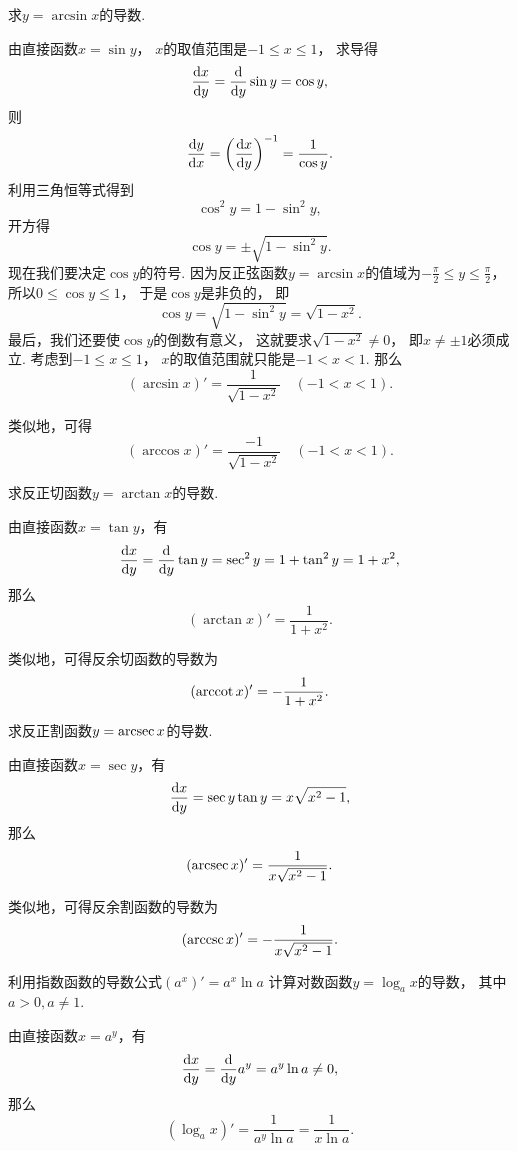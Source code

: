 \begin{example}
求\(y=\arcsin x\)的导数.
\begin{solution}
由直接函数\(x=\sin y\)，
\(x\)的取值范围是\(-1 \leq x \leq 1\)，
求导得\[
	\dv{x}{y}
	= \dv{y} \sin y
	= \cos y,
\]
则\[
	\dv{y}{x}
	= \left(\dv{x}{y}\right)^{-1}
	= \frac1{\cos y}.
\]
利用三角恒等式得到\[
	\cos^2 y = 1 - \sin^2 y,
\]
开方得\[
	\cos y = \pm\sqrt{1 - \sin^2 y}.
\]
现在我们要决定\(\cos y\)的符号.
因为反正弦函数\(y = \arcsin x\)的值域为\(-\frac\pi2 \leq y \leq \frac\pi2\)，
所以\(0 \leq \cos y \leq 1\)，
于是\(\cos y\)是非负的，
即\[
	\cos y
	= \sqrt{1 - \sin^2 y}
	= \sqrt{1 - x^2}.
\]
最后，我们还要使\(\cos y\)的倒数有意义，
这就要求\(\sqrt{1-x^2}\neq0\)，
即\(x\neq\pm1\)必须成立.
考虑到\(-1 \leq x \leq 1\)，
\(x\)的取值范围就只能是\(-1 < x < 1\).
那么\[
	(\arcsin x)' = \frac1{\sqrt{1 - x^2}}
	\quad(-1<x<1).
\]
\end{solution}
\end{example}

类似地，可得\[
	(\arccos x)' = \frac{-1}{\sqrt{1 - x^2}}
	\quad(-1<x<1).
\]

\begin{example}
求反正切函数\(y=\arctan x\)的导数.
\begin{solution}
由直接函数\(x=\tan y\)，有\[
	\dv{x}{y}
	= \dv{y} \tan y
	= \sec^2 y
	= 1 + \tan^2 y
	= 1 + x^2,
\]
那么\[
	(\arctan x)' = \frac1{1+x^2}.
\]
\end{solution}
\end{example}

类似地，可得反余切函数的导数为\[
	(\arccot x)' = -\frac1{1+x^2}.
\]

\begin{example}
求反正割函数\(y=\arcsec x\)的导数.
\begin{solution}
由直接函数\(x=\sec y\)，有\[
	\dv{x}{y}
	= \sec y \tan y
	= x \sqrt{x^2-1},
\]
那么\[
	(\arcsec x)' = \frac1{x \sqrt{x^2-1}}.
\]
\end{solution}
\end{example}

类似地，可得反余割函数的导数为\[
	(\arccsc x)' = -\frac1{x \sqrt{x^2-1}}.
\]

\begin{example}
利用指数函数的导数公式\((a^x)' = a^x \ln a\)
计算对数函数\(y=\log_a x\)的导数，
其中\(a>0,a\neq1\).
\begin{solution}
由直接函数\(x=a^y\)，有\[
	\dv{x}{y} = \dv{y} a^y = a^y \ln a \neq 0,
\]
那么\[
	(\log_a x)' = \frac1{a^y \ln a} = \frac1{x \ln a}.
\]
\end{solution}
\end{example}

